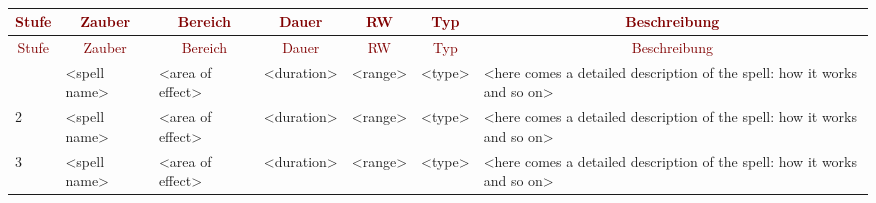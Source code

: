\begin{center}
\begin{commentbox}
\begin{center}
\textcolor{Maroon}{}\\
\textcolor{Maroon}{}
\end{center}
\end{commentbox}
{\fontsize{8}{10}\selectfont
\begin{longtable}{p{1cm}p{3cm}p{1.5cm}p{1.5cm}p{1cm}p{1cm}p{6cm}}

\multicolumn{1}{c}{\textcolor{Maroon}{Stufe}} & \multicolumn{1}{c}{\textcolor{Maroon}{Zauber}} & \multicolumn{1}{c}{\textcolor{Maroon}{Bereich}} & \multicolumn{1}{c}{\textcolor{Maroon}{Dauer}} & \multicolumn{1}{c}{\textcolor{Maroon}{RW}} & \multicolumn{1}{c}{\textcolor{Maroon}{Typ}} & \multicolumn{1}{c}{\textcolor{Maroon}{Beschreibung}}  \\ \hline 
\endfirsthead

\multicolumn{1}{c}{\textcolor{Maroon}{Stufe}} & \multicolumn{1}{c}{\textcolor{Maroon}{Zauber}} & \multicolumn{1}{c}{\textcolor{Maroon}{Bereich}} & \multicolumn{1}{c}{\textcolor{Maroon}{Dauer}} & \multicolumn{1}{c}{\textcolor{Maroon}{RW}} & \multicolumn{1}{c}{\textcolor{Maroon}{Typ}} & \multicolumn{1}{c}{\textcolor{Maroon}{Beschreibung}}  \\
\hline 
\endhead

\endfoot

\endlastfoot
\hline
1 & <spell name> & <area of effect> & <duration> & <range> & <type> & <here comes a detailed description of the spell: how it works and so on> \\ \hline
2 & <spell name> & <area of effect> & <duration> & <range> & <type> & <here comes a detailed description of the spell: how it works and so on> \\ \hline
3 & <spell name> & <area of effect> & <duration> & <range> & <type> & <here comes a detailed description of the spell: how it works and so on> \\ \hline
\end{longtable}
}
\end{center}
